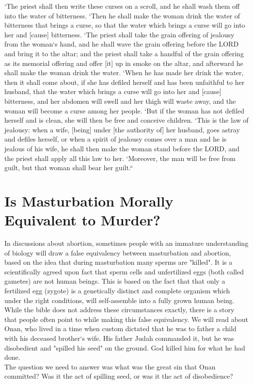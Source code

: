 \begin{scripture}[Numbers 5:11-31]
    `The priest shall then write these curses on a scroll, and he shall wash them off into the water of bitterness.
    `Then he shall make the woman drink the water of bitterness that brings a curse, so that the water which brings a curse will go into her and [cause] bitterness.
    `The priest shall take the grain offering of jealousy from the woman`s hand, and he shall wave the grain offering before the LORD and bring it to the altar;
    and the priest shall take a handful of the grain offering as its memorial offering and offer [it] up in smoke on the altar, and afterward he shall make the woman drink the water.
    `When he has made her drink the water, then it shall come about, if she has defiled herself and has been unfaithful to her husband, that the water which brings a curse will go into her and [cause] bitterness, and her abdomen will swell and her thigh will waste away, and the woman will become a curse among her people.
    `But if the woman has not defiled herself and is clean, she will then be free and conceive children.
    `This is the law of jealousy: when a wife, [being] under [the authority of] her husband, goes astray and defiles herself,
    or when a spirit of jealousy comes over a man and he is jealous of his wife, he shall then make the woman stand before the LORD, and the priest shall apply all this law to her.
    `Moreover, the man will be free from guilt, but that woman shall bear her guilt.``
\end{scripture}


\pagebreak
\section{Is Masturbation Morally Equivalent to Murder?}
\begin{fullwidth}

    In discussions about abortion, sometimes people with an immature understanding of biology will draw a false equivalency between masturbation and abortion, based on the idea that during masturbation many sperms are "killed". It is a scientifically 
    agreed upon fact that sperm cells and unfertilized eggs (both called gametes) are not human beings. This is based on the fact that that only a fertilized egg (zygote) is a genetically distinct and complete organism which under the right conditions, 
    will self-assemble into a fully grown human being. \\
    While the bible does not address these circumstances exactly, there is a story that people often point to while making this false equivalency. We will read about Onan, who lived in a time when custom dictated that he was to father a child with his deceased brother`s wife. His father Judah commanded it, but he was 
    disobedient and "spilled his seed" on the ground. God killed him for what he had done.\\ The question we need to answer was what was the great sin that Onan committed? Was it the act of spilling seed, or was it the act of disobedience?
\end{fullwidth}

